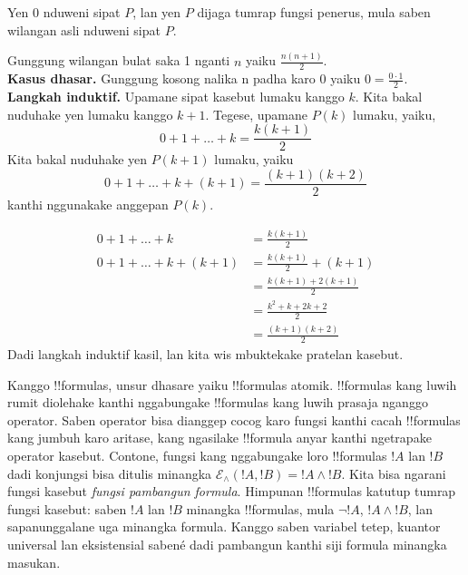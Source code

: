 \documentclass[../../../include/open-logic-section]{subfiles}
\begin{document}
\begin{defn}
Yen 0 nduweni sipat $P$, lan yen $P$ dijaga tumrap fungsi penerus,
mula saben wilangan asli nduweni sipat $P$.
\end{defn}

\begin{ex} Gunggung wilangan bulat saka 1 nganti $n$ yaiku $\frac{n(n+1)}{2}$. \\

\textbf{Kasus dhasar.} Gunggung kosong nalika n padha karo 0 yaiku
$0=\frac{0\cdot 1}{2}$.\\

\textbf{Langkah induktif.} Upamane sipat kasebut lumaku kanggo $k$.
Kita bakal nuduhake yen lumaku kanggo $k+1$. Tegese, upamane $P(k)$
lumaku, yaiku,
\[ 0 + 1 + \ldots + k = \frac{k(k+1)}{2} \]
Kita bakal nuduhake yen $P(k+1)$ lumaku, yaiku
\[ 0 + 1 + \ldots + k + (k+1) = \frac{(k+1)(k+2)}{2} \]
kanthi nggunakake anggepan $P(k)$.

\begin{align*}
0 + 1 + \ldots + k &= \frac{k(k+1)}{2} \tag{Anggepan} \\
0 + 1 + \ldots + k + (k+1) &= \frac{k(k+1)}{2} + (k+1)
\tag{Tambah $k+1$ ing loro sisih} \\
&= \frac{k(k+1) + 2(k+1)}{2} \\
&= \frac{k^2 + k + 2k +2}{2} \\
&=\frac{(k+1)(k+2)}{2}
\end{align*}
Dadi langkah induktif kasil, lan kita wis mbuktekake pratelan kasebut.
\end{ex}

\begin{explain}
Kanggo !!{formula}s, unsur dhasare yaiku !!{formula}s atomik.
!!{formula}s kang luwih rumit diolehake kanthi nggabungake
!!{formula}s kang luwih prasaja nganggo operator. Saben operator
bisa dianggep cocog karo fungsi kanthi cacah !!{formula}s kang
jumbuh karo aritase, kang ngasilake !!{formula} anyar kanthi
ngetrapake operator kasebut. Contone, fungsi kang nggabungake
loro !!{formula}s $!A$ lan $!B$ dadi konjungsi bisa ditulis
minangka $\mathcal E _\land (!A, !B) = !A \land !B$.
Kita bisa ngarani fungsi kasebut \emph{fungsi pambangun formula}.
Himpunan !!{formula}s katutup tumrap fungsi kasebut:
saben $!A$ lan $!B$ minangka !!{formula}s, mula $\lnot !A$,
$!A \land !B$, lan sapanunggalane uga minangka formula.
Kanggo saben variabel tetep, kuantor universal lan eksistensial
sabené dadi pambangun kanthi siji formula minangka masukan.
\end{explain}
\end{document}
